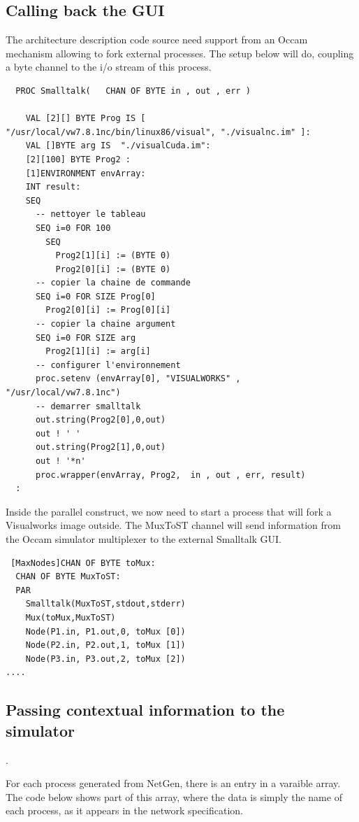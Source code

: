 \subsection{Calling back the GUI}

The architecture description code source need support from an Occam mechanism allowing 
to fork external processes. The setup below will do, coupling a byte channel
to the i/o stream of this process.

\begin{lstlisting}
  PROC Smalltalk(   CHAN OF BYTE in , out , err )

    VAL [2][] BYTE Prog IS [ "/usr/local/vw7.8.1nc/bin/linux86/visual", "./visualnc.im" ]:
    VAL []BYTE arg IS  "./visualCuda.im":
    [2][100] BYTE Prog2 :
    [1]ENVIRONMENT envArray:
    INT result:
    SEQ
      -- nettoyer le tableau
      SEQ i=0 FOR 100
        SEQ
          Prog2[1][i] := (BYTE 0)
          Prog2[0][i] := (BYTE 0)
      -- copier la chaine de commande
      SEQ i=0 FOR SIZE Prog[0]
        Prog2[0][i] := Prog[0][i]
      -- copier la chaine argument
      SEQ i=0 FOR SIZE arg
        Prog2[1][i] := arg[i]
      -- configurer l'environnement
      proc.setenv (envArray[0], "VISUALWORKS" , "/usr/local/vw7.8.1nc")
      -- demarrer smalltalk
      out.string(Prog2[0],0,out)
      out ! ' '
      out.string(Prog2[1],0,out)
      out ! '*n'
      proc.wrapper(envArray, Prog2,  in , out , err, result)
  :
\end{lstlisting}


Inside the parallel construct, we now need to start a process that will fork a 
Visualworks image outside. The MuxToST channel will send information from
the Occam simulator multiplexer to the external Smalltalk GUI.
\begin{lstlisting} 
 [MaxNodes]CHAN OF BYTE toMux:
  CHAN OF BYTE MuxToST:
  PAR
    Smalltalk(MuxToST,stdout,stderr)
    Mux(toMux,MuxToST)
    Node(P1.in, P1.out,0, toMux [0])
    Node(P2.in, P2.out,1, toMux [1])
    Node(P3.in, P3.out,2, toMux [2])
....
\end{lstlisting}

\subsection{Passing contextual information to the simulator}.


For each process generated from NetGen, there is an entry in a varaible array.
The code below shows part of this array, where the data is simply the name 
of each process, as it appears in the network specification.

